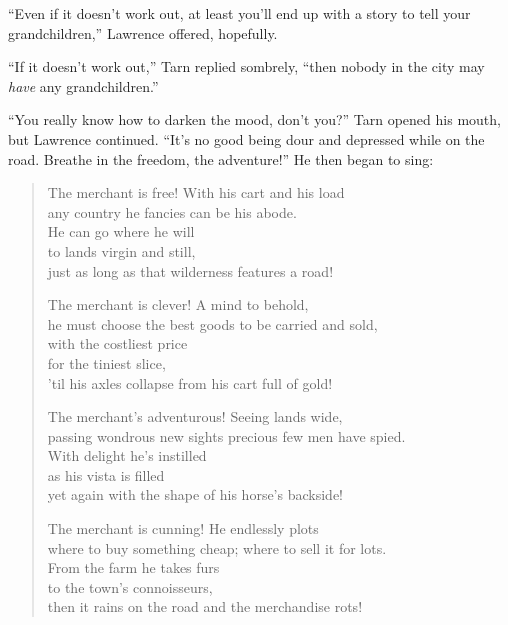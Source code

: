 ``Even if it doesn't work out, at least you'll end up with a story to tell your grandchildren,'' Lawrence offered, hopefully.

``If it doesn't work out,'' Tarn replied sombrely, ``then nobody in the city may \emph{have} any grandchildren.''

``You really know how to darken the mood, don't you?''  Tarn opened his mouth, but Lawrence continued. ``It's no good being dour and depressed while on the road.  Breathe in the freedom, the adventure!''  He then began to sing:

\begin{verse}
The merchant is free! With his cart and his load\\
any country he fancies can be his abode.\\
\hspace{2em}He can go where he will\\
\hspace{2em}to lands virgin and still,\\
just as long as that wilderness features a road!

The merchant is clever!  A mind to behold,\\
he must choose the best goods to be carried and sold,\\
\hspace{2em}with the costliest price\\
\hspace{2em}for the tiniest slice,\\
'til his axles collapse from his cart full of gold!

The merchant's adventurous!  Seeing lands wide,\\
passing wondrous new sights precious few men have spied.\\
\hspace{2em}With delight he's instilled\\
\hspace{2em}as his vista is filled\\
yet again with the shape of his horse's backside!

The merchant is cunning!  He endlessly plots\\
where to buy something cheap; where to sell it for lots.\\
\hspace{2em}From the farm he takes furs\\
\hspace{2em}to the town's connoisseurs,\\
then it rains on the road and the merchandise rots!


\end{verse}

